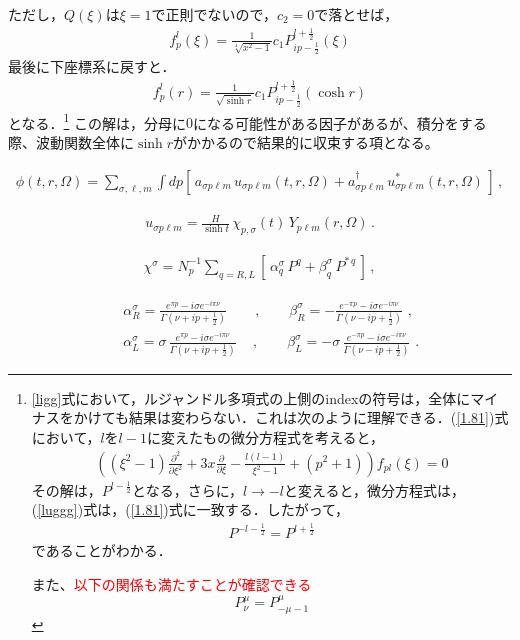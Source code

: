 ただし，$Q(\xi)$は$\xi=1$で正則でないので，$c_2=0$で落とせば，
\begin{align}
  f^l_p(\xi)=\frac{1}{\sqrt[4]{x^2-1}}c_1 P_{i p-\frac{1}{2}}^{l+\frac{1}{2}}(\xi)
\end{align}
最後に下座標系に戻すと．
\begin{align}
  \label{lugg}
  f^l_p(r)=\frac{1}{\sqrt{\sinh r}}c_1 P_{i p-\frac{1}{2}}^{l+\frac{1}{2}}(\cosh r)
\end{align}
となる．\footnote{\ref{ligg}式において，ルジャンドル多項式の上側のindexの符号は，全体にマイナスをかけても結果は変わらない．これは次のように理解できる．(\ref{1.81})式において，$l$を$l-1$に変えたもの微分方程式を考えると，
\begin{align}
\label{luggg}
\left(\left(\xi^2-1\right)\frac{\partial^2}{\partial \xi^2}+3 x \frac{\partial}{\partial \xi}-\frac{l (l-1)}{\xi^2-1}+(p^2+1)\right)f_{pl}(\xi)=0
\end{align}
その解は，$P^{l-\frac{1}{2}}$となる，さらに，$l\to-l$と変えると，微分方程式は，(\ref{luggg})式は，(\ref{1.81})式に一致する．したがって，
\begin{align}
  P^{-l-\frac{1}{2}}=P^{l+\frac{1}{2}}
\end{align}
であることがわかる．

また、\textcolor{red}{以下の関係も満たすことが確認できる}
\begin{equation}
  P^{\mu}_{\nu}=P^{\mu}_{-\mu-1}
\end{equation}
}
この解は，分母に$0$になる可能性がある因子があるが、積分をする際、波動関数全体に$\sinh r$がかかるので結果的に収束する項となる。


\begin{eqnarray}
\hat\phi(t,r,\Omega) = \sum_{\sigma,\ell,m} \int dp
\left[\,a_{\sigma p\ell m}\,u_{\sigma p\ell m}(t,r,\Omega)
+a_{\sigma p\ell m}^\dagger\,u^*_{\sigma p\ell m}(t,r,\Omega)\,\right]\,,
\label{phi}
\end{eqnarray}


\begin{eqnarray}
u_{\sigma p\ell m} = \frac{H}{\sinh t}\,
\chi_{p,\sigma}(t)\,Y_{p\ell m} (r, \Omega)\,.
\label{bdmf}
\end{eqnarray}

\begin{eqnarray}
\chi^{\sigma} = N_p^{-1} \sum_{q=R,L} \left[\,
 \alpha_q^\sigma\,P^q + \beta_q^\sigma\,P^{*\,q}
\,\right]\,,
\label{sty2}
\end{eqnarray}


\begin{eqnarray}
&&\alpha_R^\sigma = \frac{e^{\pi p} -i\sigma e^{-i\pi \nu}}{\Gamma (\nu+ip +\frac{1}{2})}\qquad,\qquad
\beta_R^\sigma =-\frac{e^{-\pi p} -i\sigma e^{-i\pi \nu}}{\Gamma (\nu-ip +\frac{1}{2})} \,\,,\\
&&\alpha_L^\sigma =\sigma\,\frac{e^{\pi p} -i\sigma e^{-i\pi \nu}}{\Gamma (\nu+ip +\frac{1}{2})}
\quad\,,\qquad
\beta_L^\sigma =-\sigma\,\frac{e^{-\pi p} -i\sigma e^{-i\pi \nu}}{\Gamma (\nu-ip +\frac{1}{2})}   \,\,.
\end{eqnarray}


